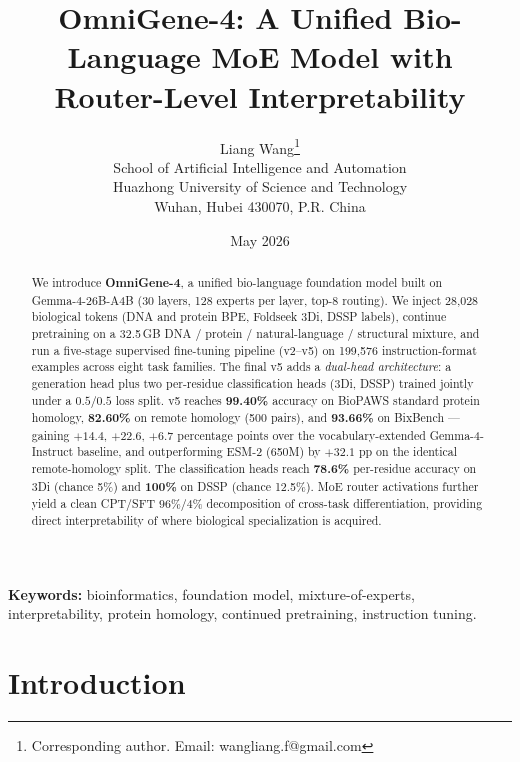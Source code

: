 \documentclass[11pt]{article}
\title{\textbf{OmniGene-4: A Unified Bio-Language MoE Model with\\ Router-Level Interpretability}}
\author{Liang Wang\thanks{Corresponding author. Email: wangliang.f@gmail.com}\\
\small School of Artificial Intelligence and Automation\\
\small Huazhong University of Science and Technology\\
\small Wuhan, Hubei 430070, P.R. China}
\date{May 2026}
\begin{document}
\maketitle

\begin{abstract}
\noindent We introduce \textbf{OmniGene-4}, a unified bio-language foundation model built on Gemma-4-26B-A4B (30 layers, 128 experts per layer, top-8 routing). We inject 28{,}028 biological tokens (DNA and protein BPE, Foldseek 3Di, DSSP labels), continue pretraining on a 32.5\,GB DNA / protein / natural-language / structural mixture, and run a five-stage supervised fine-tuning pipeline (v2--v5) on 199{,}576 instruction-format examples across eight task families. The final v5 adds a \emph{dual-head architecture}: a generation head plus two per-residue classification heads (3Di, DSSP) trained jointly under a $0.5/0.5$ loss split. v5 reaches \textbf{99.40\%} accuracy on BioPAWS standard protein homology, \textbf{82.60\%} on remote homology (500 pairs), and \textbf{93.66\%} on BixBench --- gaining $+14.4$, $+22.6$, $+6.7$ percentage points over the vocabulary-extended Gemma-4-Instruct baseline, and outperforming ESM-2 (650M) by $+32.1$ pp on the identical remote-homology split. The classification heads reach \textbf{78.6\%} per-residue accuracy on 3Di (chance 5\%) and \textbf{100\%} on DSSP (chance 12.5\%). MoE router activations further yield a clean CPT/SFT $96\%/4\%$ decomposition of cross-task differentiation, providing direct interpretability of where biological specialization is acquired.
\end{abstract}

\medskip
\noindent\textbf{Keywords:} bioinformatics, foundation model, mixture-of-experts, interpretability, protein homology, continued pretraining, instruction tuning.



\section{Introduction}
\end{document}
